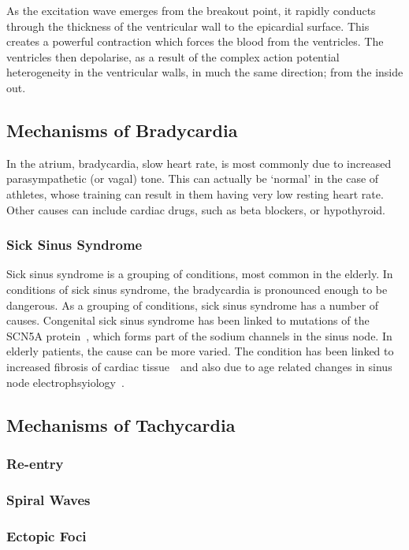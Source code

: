 As the excitation wave emerges from the breakout point, it rapidly conducts
through the thickness of the ventricular wall to the epicardial surface.
This creates a powerful contraction which forces the blood from the ventricles.
The ventricles then depolarise, as a result of the complex action potential
heterogeneity in the ventricular walls, in much the same direction; from the
inside out.

\subsection{Mechanisms of Bradycardia}

In the atrium, bradycardia, slow heart rate, is most commonly due to increased
parasympathetic (or vagal) tone.
This can actually be `normal' in the case of athletes, whose training can result
in them having very low resting heart rate.
Other causes can include cardiac drugs, such as beta blockers, or hypothyroid.

\subsubsection{Sick Sinus Syndrome}

Sick sinus syndrome is a grouping of conditions, most common in the elderly.
In conditions of sick sinus syndrome, the bradycardia is pronounced enough to be
dangerous.
As a grouping of conditions, sick sinus syndrome has a number of causes.
Congenital sick sinus syndrome has been linked to mutations of the SCN5A
protein~\cite{Benson2003}, which forms part of the sodium channels in the sinus
node.
In elderly patients, the cause can be more varied.
The condition has been linked to increased fibrosis of cardiac
tissue~\cite{Kohl2005}\ and also due to age related changes in sinus node
electrophsyiology~\cite{Alings1993}.

\subsection{Mechanisms of Tachycardia}

\subsubsection{Re-entry}

\subsubsection{Spiral Waves}

\subsubsection{Ectopic Foci}
